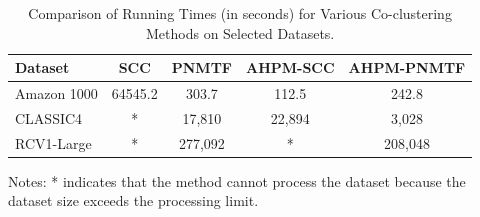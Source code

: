 \documentclass[letterpaper, 10 pt, conference]{ieeeconf}  %
\begin{document}
\begin{table}[!htbp]
    \centering
    \caption{Comparison of Running Times (in seconds) for Various Co-clustering Methods on Selected Datasets.}
    \label{tab:running-time}
    \begin{tabular}{@{} l cccc @{}}
        \toprule
        Dataset     & SCC \cite{dhillon2001CoclusteringDocumentsWords} & PNMTF \cite{chen2023ParallelNonNegativeMatrix} & \textbf{AHPM-SCC} & \textbf{AHPM-PNMTF} \\
        \midrule
        Amazon 1000 & 64545.2                                          & 303.7                                          & 112.5             & 242.8               \\
        CLASSIC4    & *                                                & 17,810                                         & 22,894            & 3,028               \\
        RCV1-Large  & *                                                & 277,092                                        & *                 & 208,048             \\
        \bottomrule
    \end{tabular}
    \begin{tablenotes}
        \small
        \item Notes: * indicates that the method cannot process the dataset because the dataset size exceeds the processing limit.
    \end{tablenotes}
\end{table}
\end{document}
